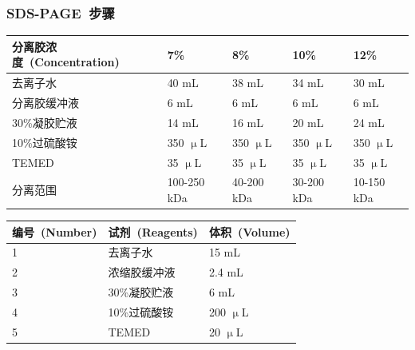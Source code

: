 \subsubsection{SDS-PAGE\ 步骤}
\begin{table}[!ht]
\centering
{
\par}
\small
\begin{tabular*}{\textwidth}[c]{@{\extracolsep{\fill}}lllll}
\toprule
分离胶浓度\ (Concentration) & 7\% & 8\% & 10\%& 12\%\\
\midrule
去离子水 & 40 mL & 38 mL & 34 mL& 30 mL\\
分离胶缓冲液 & 6 mL & 6 mL & 6 mL& 6 mL\\
30\%凝胶贮液 & 14 mL & 16 mL & 20 mL & 24 mL\\
10\%过硫酸铵 & 350 $\upmu$L & 350 $\upmu$L & 350 $\upmu$L& 350 $\upmu$L\\
TEMED & 35 $\upmu$L & 35 $\upmu$L & 35 $\upmu$L & 35 $\upmu$L\\
分离范围 & 100-250 kDa & 40-200 kDa & 30-200 kDa & 10-150 kDa\\
\bottomrule
\end{tabular*}
\end{table}

\begin{table}[!ht]
\centering
{
\par}
\small
\begin{tabular*}{\textwidth}[c]{@{\extracolsep{\fill}}lll}
\toprule
编号\ (Number) & 试剂\ (Reagents) & 体积\ (Volume)\\
\midrule
1 & 去离子水 & 15 mL\\
2 & 浓缩胶缓冲液 & 2.4 mL\\
3 & 30\%凝胶贮液 & 6 mL\\
4 & 10\%过硫酸铵 & 200 $\upmu$L\\
5 & TEMED & 20 $\upmu$L\\
\bottomrule
\end{tabular*}
\end{table}

